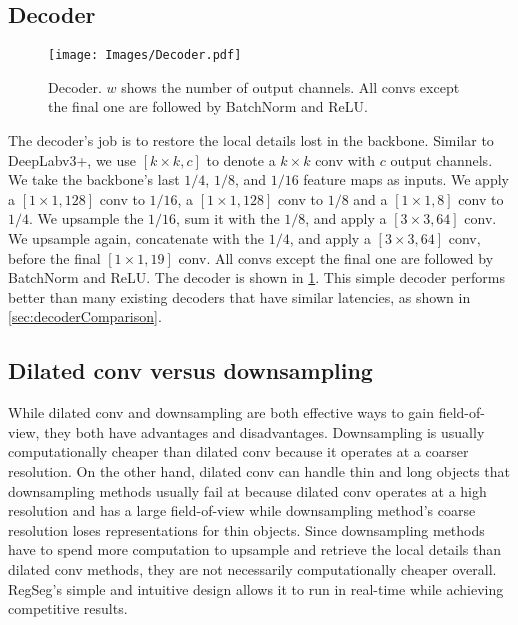 \documentclass[10pt,twocolumn,letterpaper]{article}
\begin{document}
\subsection{Decoder}
\label{sec:decoder}


\begin{figure}
  \centering
    \texttt{[image: Images/Decoder.pdf]}

   \caption{Decoder. $w$ shows the number of output channels. All convs except the final one are followed by BatchNorm\cite{batchnorm} and ReLU.}
   \label{fig:Decoder}
\end{figure}

The decoder's job is to restore the local details lost in the backbone. Similar to DeepLabv3+\cite{deeplabv3plus2018}, we use $[k\times k, c]$ to denote a $k\times k$ conv with $c$ output channels. We take the backbone's last $1/4$, $1/8$, and $1/16$ feature maps as inputs. We apply a $[1\times 1, 128]$ conv to $1/16$, a $[1\times 1, 128]$ conv to $1/8$ and a $[1\times 1, 8]$ conv to $1/4$. We upsample the $1/16$, sum it with the $1/8$, and apply a $[3\times 3, 64]$ conv. We upsample again, concatenate with the $1/4$, and apply a $[3\times 3, 64]$ conv, before the final $[1\times 1, 19]$ conv. All convs except the final one are followed by BatchNorm\cite{batchnorm} and ReLU. The decoder is shown in \cref{fig:Decoder}. This simple decoder performs better than many existing decoders that have similar latencies, as shown in \cref{sec:decoderComparison}.

\subsection{Dilated conv versus downsampling}
While dilated conv and downsampling are both effective ways to gain field-of-view, they both have advantages and disadvantages. Downsampling is usually computationally cheaper than dilated conv because it operates at a coarser resolution. On the other hand, dilated conv can handle thin and long objects that downsampling methods usually fail at because dilated conv operates at a high resolution and has a large field-of-view while downsampling method's coarse resolution loses representations for thin objects. Since downsampling methods have to spend more computation to upsample and retrieve the local details than dilated conv methods, they are not necessarily computationally cheaper overall. RegSeg's simple and intuitive design allows it to run in real-time while achieving competitive results.
\end{document}

